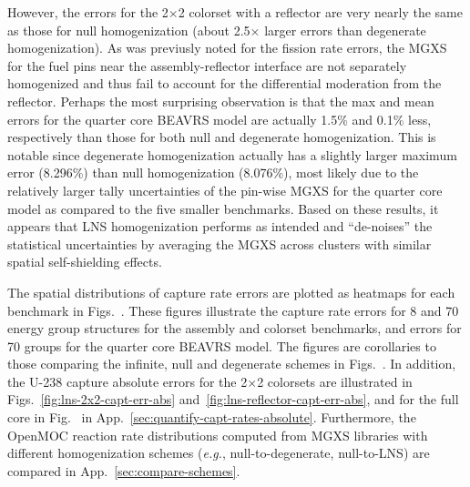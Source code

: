 However, the errors for the 2$\times$2 colorset with a reflector are very nearly the same as those for null homogenization (about 2.5$\times$ larger errors than degenerate homogenization). As was previusly noted for the fission rate errors, the \ac{MGXS} for the fuel pins near the assembly-reflector interface are not separately homogenized and thus fail to account for the differential moderation from the reflector. Perhaps the most surprising observation is that the max and mean errors for the quarter core \ac{BEAVRS} model are actually 1.5\% and 0.1\% less, respectively than those for both null and degenerate homogenization. This is notable since degenerate homogenization actually has a slightly larger maximum error (8.296\%) than null homogenization (8.076\%), most likely due to the relatively larger tally uncertainties of the pin-wise \ac{MGXS} for the quarter core model as compared to the five smaller benchmarks. Based on these results, it appears that \ac{LNS} homogenization performs as intended and ``de-noises'' the statistical uncertainties by averaging the \ac{MGXS} across clusters with similar spatial self-shielding effects.

The spatial distributions of capture rate errors are plotted as heatmaps for each benchmark in Figs.~. These figures illustrate the capture rate errors for 8 and 70 energy group structures for the assembly and colorset benchmarks, and errors for 70 groups for the quarter core \ac{BEAVRS} model. The figures are corollaries to those comparing the infinite, null and degenerate schemes in Figs.~. In addition, the U-238 capture absolute errors for the 2$\times$2 colorsets are illustrated in Figs.~\ref{fig:lns-2x2-capt-err-abs} and~\ref{fig:lns-reflector-capt-err-abs}, and for the full core in Fig.~ in App.~\ref{sec:quantify-capt-rates-absolute}. Furthermore, the OpenMOC reaction rate distributions computed from \ac{MGXS} libraries with different homogenization schemes (\textit{e.g.}, null-to-degenerate, null-to-\ac{LNS}) are compared in App.~\ref{sec:compare-schemes}.

